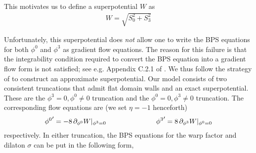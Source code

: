 \documentclass[12pt]{article}
\begin{document}
This motivates us to define a superpotential $W$ as 
\begin{eqnarray}
W = \sqrt{S_0^2 + S_3^2}
\end{eqnarray}
\iffalse
This can also be motivated from the integrability of the gravitino equation. Namely, one would usually expect integrability to give something proportional to $W^2$, i.e.
\begin{eqnarray}
[D_m , D_n] \epsilon_A = 2 W^2 \,\gamma_{mn} \epsilon_A
\end{eqnarray}
and indeed one finds.
Requiring that the warp factor BPS equation may be re-expressed as an equation linear in the superpotential, i.e.
\begin{eqnarray}
f' = 2 (G_0 S_0 + G_3 S_3)
\nonumber\\
= 2 \, \gamma \,W
\end{eqnarray}
gives us a factor $\gamma$ defined as
\begin{eqnarray}
\gamma = {G_0 S_0 + G_3 S_3 \over \sqrt{S_0^2 + S_3^2}}
\end{eqnarray}
We now make the non-trivial check that, with these definitions of $W$ and $\gamma$, the BPS equation for $\sigma$ takes the expected gradient flow form, 
\begin{eqnarray}
\sigma ' =2 \eta \, \sqrt{N_0^2 + N_3^2}
\nonumber\\
= -2 \left({- S_0 N_0 + S_3 N_3 \over G_0 S_0 + G_3 S_3}\right)
\nonumber\\
= -2\, \gamma^{-1} \,\partial_\sigma W
\end{eqnarray}
exactly as expected.
\fi
Unfortunately, this superpotential does \textit{not} allow one to write the BPS equations for both $\phi^0$ and $\phi^3$ as gradient flow equations. The reason for this failure is that the integrability condition required to convert the BPS equation into a gradient flow form is not satisfied; see e.g. Appendix C.2.1 of . We thus follow the strategy of  to construct an approximate superpotential. Our model consists of two consistent truncations that admit flat domain walls and an exact superpotential. These are the $\phi^3=0,\phi^0\ne0$ truncation and the $\phi^0=0,\phi^3\ne0$ truncation. The corresponding flow equations are (we set $\eta=-1$ henceforth)
\begin{eqnarray}
{\phi^0}' = -8 \, \partial_{\phi^0} W|_{\phi^3=0} \hspace{1 in} {\phi^3}' =8 \, \partial_{\phi^3} W|_{\phi^0=0}
\end{eqnarray}
respectively. In either truncation, the BPS equations for the warp factor and dilaton $\sigma$ can be put in the following form,
\end{document}
